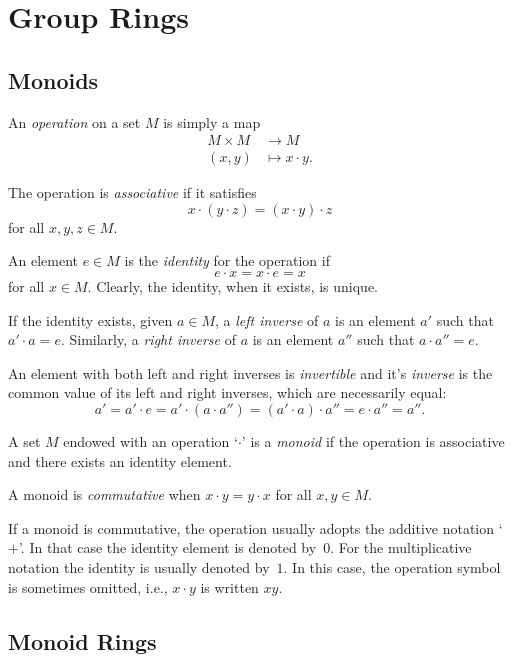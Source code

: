\chapter{Group Rings}

\section{Monoids}

An \textsl{operation} on a set $M$ is simply a map
\begin{align*}
    M\times M&\to M\\
    (x,y)&\mapsto x\cdot y.
\end{align*}

The operation is \textsl{associative} if it satisfies
$$
    x\cdot(y\cdot z) = (x\cdot y)\cdot z
$$
for all $x,y,z\in M$.

An element $e\in M$ is the \textsl{identity} for the operation if
$$
    e\cdot x = x\cdot e = x
$$
for all $x\in M$. Clearly, the identity, when it exists, is unique.

If the identity exists, given $a\in M$, a \textsl{left inverse} of $a$ is an element $a'$ such that $a'\cdot a= e$. Similarly, a \textsl{right inverse} of $a$ is an element $a''$ such that $a\cdot a''=e$.

An element with both left and right inverses is \textsl{invertible} and it's \textsl{inverse} is the common value of its left and right inverses, which are necessarily equal:
$$
    a' = a'\cdot e = a'\cdot (a\cdot a'') = (a'\cdot a)\cdot a''
        = e\cdot a'' = a''.
$$

A set $M$ endowed with an operation `$\cdot$' is a \textsl{monoid} if the operation is associative and there exists an identity element.

A monoid is \textsl{commutative} when $x\cdot y=y\cdot x$ for all $x,y\in M$.

If a monoid is commutative, the operation usually adopts the additive notation `$+$'. In that case the identity element is denoted by~$0$. For the multiplicative notation the identity is usually denoted by~$1$. In this case, the operation symbol is sometimes omitted, i.e., $x\cdot y$ is written $xy$.

\section{Monoid Rings}

